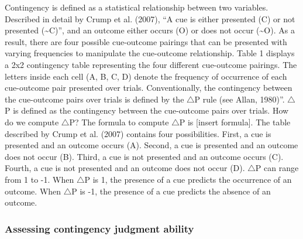 \documentclass[
  english,
  man,floatsintext]{apa6}
\begin{document}
Contingency is defined as a statistical relationship between two variables. Described in detail by Crump et al. (2007), \enquote{A cue is either presented (C) or not presented (\textasciitilde C)}, and an outcome either occurs (O) or does not occur (\textasciitilde O). As a result, there are four possible cue-outcome pairings that can be presented with varying frequencies to manipulate the cue-outcome relationship. Table 1 displays a 2x2 contingency table representing the four different cue-outcome pairings. The letters inside each cell (A, B, C, D) denote the frequency of occurrence of each cue-outcome pair presented over trials. Conventionally, the contingency between the cue-outcome pairs over trials is defined by the \(\triangle\)P rule (see Allan, 1980)''. \(\triangle\)P is defined as the contingency between the cue-outcome pairs over trials. How do we compute \(\triangle\)P? The formula to compute \(\triangle\)P is {[}insert formula{]}. The table described by Crump et al. (2007) contains four possibilities. First, a cue is presented and an outcome occurs (A). Second, a cue is presented and an outcome does not occur (B). Third, a cue is not presented and an outcome occurs (C). Fourth, a cue is not presented and an outcome does not occur (D). \(\triangle\)P can range from 1 to -1. When \(\triangle\)P is 1, the presence of a cue predicts the occurrence of an outcome. When \(\triangle\)P is -1, the presence of a cue predicts the absence of an outcome.

\hypertarget{assessing-contingency-judgment-ability}{%
\subsubsection{Assessing contingency judgment ability}\label{assessing-contingency-judgment-ability}}
\end{document}
